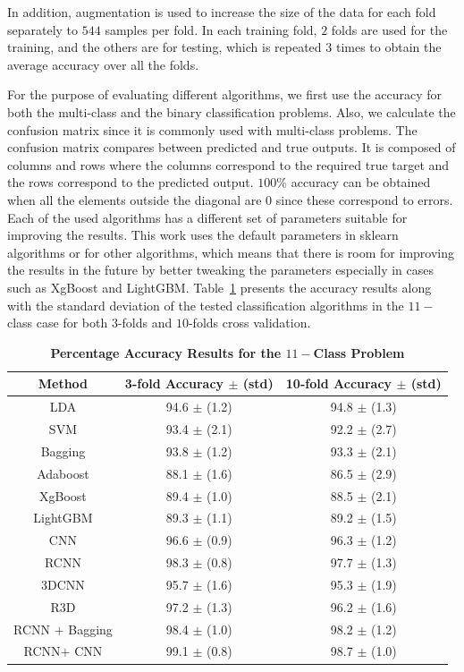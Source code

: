 \documentclass{ieeeaccess}
\begin{document}
In addition, augmentation is used to increase the size of the data for each fold separately to $544$ samples per fold. In each training fold, $2$ folds are used for the training, and the others are for testing, which is repeated $3$ times to obtain the average accuracy over all the folds.

For the purpose of evaluating different algorithms, we first use the accuracy for both the multi-class and the binary classification problems. Also, we calculate the confusion matrix since it is commonly used with multi-class problems. The confusion matrix compares between predicted and true outputs. It is composed of columns and rows where the columns correspond to the required true target and the rows correspond to the predicted output. $100\%$ accuracy can be obtained when all the elements outside the diagonal are 0 since these correspond to errors.
Each of the used algorithms has a different set of parameters suitable for improving the results. This work uses the default parameters in sklearn \cite{Pedregosa2011} algorithms or for other algorithms, which means that there is room for improving the results in the future by better tweaking the parameters especially in cases such as XgBoost and LightGBM. Table~\ref{Table05} presents the accuracy results along with the standard deviation of the tested classification algorithms in the $11-$class case for both $3$-folds and $10$-folds cross validation.

\begin{table}
\caption{\textbf{Percentage Accuracy Results for the $11-$Class Problem}}
\label{Table05}
\setlength{\tabcolsep}{3pt}
\begin{center}
\begin{tabular}{|c|c|c|}
\hline
\textbf{Method}	& \textbf{3-fold Accuracy $\pm$ (std)}	& \textbf{10-fold Accuracy $\pm$ (std)} \\ \hline \hline
LDA	& 94.6 $\pm$ (1.2)	& 94.8 $\pm$ (1.3) \\ \hline
SVM	& 93.4 $\pm$ (2.1)	& 92.2 $\pm$ (2.7) \\ \hline
Bagging	& 93.8 $\pm$ (1.2)	& 93.3 $\pm$ (2.1) \\ \hline
Adaboost	& 88.1 $\pm$ (1.6)	& 86.5 $\pm$ (2.9) \\ \hline
XgBoost	& 89.4 $\pm$ (1.0)	& 88.5 $\pm$ (2.1) \\ \hline
LightGBM	& 89.3 $\pm$ (1.1)	& 89.2 $\pm$ (1.5) \\ \hline
CNN	& 96.6 $\pm$ (0.9)	& 96.3 $\pm$ (1.2) \\ \hline
RCNN	& 98.3 $\pm$ (0.8)	& 97.7 $\pm$ (1.3) \\ \hline
3DCNN	& 95.7 $\pm$ (1.6)	& 95.3 $\pm$ (1.9) \\ \hline
R3D	& 97.2 $\pm$ (1.3)	& 96.2 $\pm$ (1.6) \\ \hline
RCNN  $+$ Bagging	& 98.4 $\pm$ (1.0)	& 98.2 $\pm$ (1.2) \\ \hline
RCNN$+$ CNN	& 99.1 $\pm$ (0.8)	& 98.7 $\pm$ (1.0) \\
\hline
\end{tabular}
\end{center}
\end{table}
\end{document}
